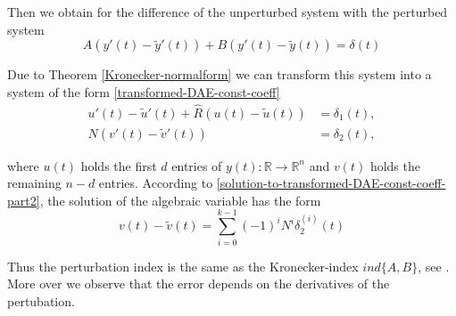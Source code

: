Then we obtain for the difference of the unperturbed system with the perturbed system 
\begin{displaymath}
	A(y'(t)-\tilde{y}'(t)) + B(y'(t)-\tilde{y}(t)) = \delta(t)
\end{displaymath}

Due to Theorem \ref{Kronecker-normalform} we can transform this system into a system of the form \eqref{transformed-DAE-const-coeff} %
\begin{align*}
	u'(t) - \tilde{u}'(t) + \hat{R} (u(t) - \tilde{u}(t) ) &= \delta_1(t), \\
	N(v'(t) - \tilde{v}'(t)) &= \delta_2(t),
\end{align*}

where $u(t)$ holds the first $d$ entries of $y(t):\mathbb{R} \to \mathbb{R}^n$ and $v(t)$ holds the remaining $n-d$ entries. According to \eqref{solution-to-transformed-DAE-const-coeff-part2}, the solution of the algebraic variable has the form
\begin{displaymath}
	v(t) - \tilde{v}(t) = \sum_{i=0}^{k-1} (-1)^iN^i \delta_2^{(i)}(t) 
\end{displaymath}

Thus the perturbation index is the same as the Kronecker-index $ind\{A,B\}$, see \cite{NumerikGewöhnlicherDifferentialgleichungen}. More over we observe that the error depends on the derivatives of the pertubation.


